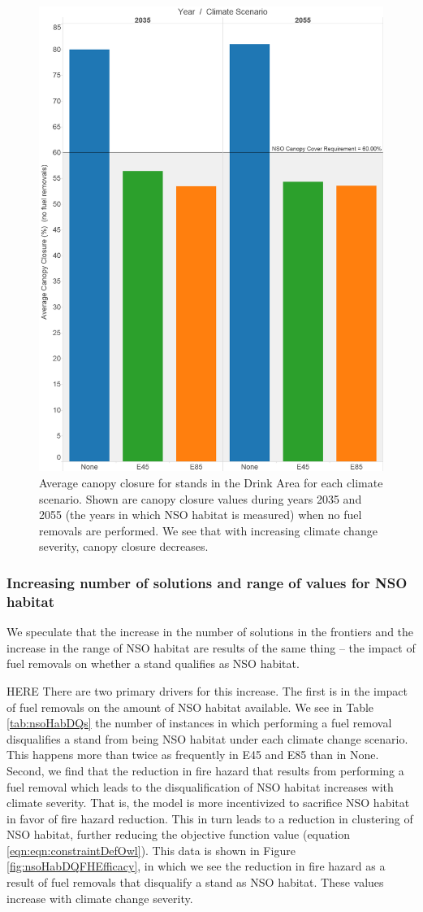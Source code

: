 \begin{figure}[ht]
\centering
\includegraphics[width=.5\textwidth]{../images/AvgCanopyCover_NoTrtmts}
\caption[Average canopy closure in the Drink Area across climate scenarios]{Average canopy closure for stands in the Drink Area for each climate scenario. Shown are canopy closure values during years 2035 and 2055 (the years in which NSO habitat is measured) when no fuel removals are performed. We see that with increasing climate change severity, canopy closure decreases.}
\label{fig:canopyClosure}
\end{figure}


\subsubsection{Increasing number of solutions and range of values for NSO habitat}
We speculate that the increase in the number of solutions in the frontiers and the increase in the range of NSO habitat are results of the same thing -- the impact of fuel removals on whether a stand qualifies as NSO habitat.

HERE
There are two primary drivers for this increase. The first is in the impact of fuel removals on the amount of NSO habitat available. We see in Table \ref{tab:nsoHabDQs} the number of instances in which performing a fuel removal disqualifies a stand from being NSO habitat under each climate change scenario. This happens more than twice as frequently in E45 and E85 than in None. Second, we find that the reduction in fire hazard that results from performing a fuel removal which leads to the disqualification of NSO habitat increases with climate severity. That is, the model is more incentivized to sacrifice NSO habitat in favor of fire hazard reduction. This in turn leads to a reduction in clustering of NSO habitat, further reducing the objective function value (equation \eqref{eqn:eqn:constraintDefOwl}). This data is shown in Figure \ref{fig:nsoHabDQFHEfficacy}, in which we see the reduction in fire hazard as a result of fuel removals that disqualify a stand as NSO habitat. These values increase with climate change severity.

